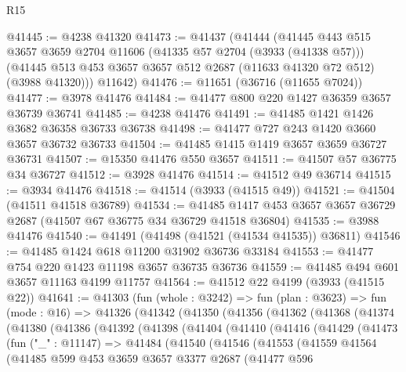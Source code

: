 \begin{lexlean}{R15}
\begin{coremodule}
@41445 := @4238 @41320
@41473 := @41437
    (@41444
      (@41445
        @443
        @515
        @3657
        @3659
        @2704
        @11606
        (@41335 @57 @2704 (@3933 (@41338 @57)))
        (@41445 @513 @453 @3657 @3657 @512 @2687 (@11633 @41320 @72 @512) (@3988 @41320)))
      @11642)
@41476 := @11651 (@36716 (@11655 @7024))
@41477 := @3978 @41476
@41484 := @41477 @800 @220 @1427 @36359 @3657 @36739 @36741
@41485 := @4238 @41476
@41491 := @41485 @1421 @1426 @3682 @36358 @36733 @36738
@41498 := @41477 @727 @243 @1420 @3660 @3657 @36732 @36733
@41504 := @41485 @1415 @1419 @3657 @3659 @36727 @36731
@41507 := @15350 @41476 @550 @3657
@41511 := @41507 @57 @36775 @34 @36727
@41512 := @3928 @41476
@41514 := @41512 @49 @36714
@41515 := @3934 @41476
@41518 := @41514 (@3933 (@41515 @49))
@41521 := @41504 (@41511 @41518 @36789)
@41534 := @41485 @1417 @453 @3657 @3657 @36729 @2687 (@41507 @67 @36775 @34 @36729 @41518 @36804)
@41535 := @3988 @41476
@41540 := @41491 (@41498 (@41521 (@41534 @41535)) @36811)
@41546 := @41485 @1424 @618 @11200 @31902 @36736 @33184
@41553 := @41477 @754 @220 @1423 @11198 @3657 @36735 @36736
@41559 := @41485 @494 @601 @3657 @11163 @4199 @11757
@41564 := @41512 @22 @4199 (@3933 (@41515 @22))
@41641 := @41303
    (fun (whole : @3242) =>
    fun (plan : @3623) =>
    fun (mode : @16) =>
    @41326
      (@41342
        (@41350
          (@41356
            (@41362
              (@41368
                (@41374
                  (@41380
                    (@41386
                      (@41392
                        (@41398
                          (@41404
                            (@41410
                              (@41416
                                (@41429
                                  (@41473
                                    (fun ("_" : @11147) =>
                                    @41484
                                      (@41540
                                        (@41546
                                          (@41553
                                            (@41559
                                              @41564
                                              (@41485
                                                @599
                                                @453
                                                @3659
                                                @3657
                                                @3377
                                                @2687
                                                (@41477
                                                  @596

\end{coremodule}
\end{lexlean}
